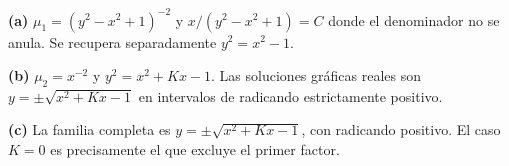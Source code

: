 \noindent\textbf{(a)} $\mu_1=(y^2-x^2+1)^{-2}$ y $x/(y^2-x^2+1)=C$ donde el denominador no se anula. Se recupera separadamente $y^2=x^2-1$.

\noindent\textbf{(b)} $\mu_2=x^{-2}$ y $y^2=x^2+Kx-1$. Las soluciones gráficas reales son $y=\pm\sqrt{x^2+Kx-1}$ en intervalos de radicando estrictamente positivo.

\noindent\textbf{(c)} La familia completa es $y=\pm\sqrt{x^2+Kx-1}$, con radicando positivo. El caso $K=0$ es precisamente el que excluye el primer factor.
